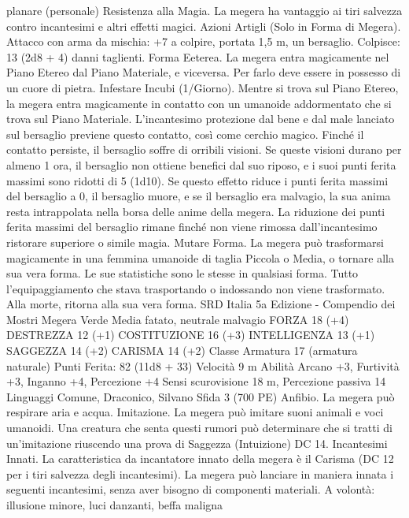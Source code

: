 \begin{multicols}{2}
planare (personale)
Resistenza alla Magia. La megera ha vantaggio ai tiri salvezza
contro incantesimi e altri effetti magici.
Azioni
Artigli (Solo in Forma di Megera). Attacco con arma da
mischia: +7 a colpire, portata 1,5 m, un bersaglio.
Colpisce: 13 (2d8 + 4) danni taglienti.
Forma Eeterea. La megera entra magicamente nel Piano Etereo
dal Piano Materiale, e viceversa. Per farlo deve essere in
possesso di un cuore di pietra.
Infestare Incubi (1/Giorno). Mentre si trova sul Piano Etereo, la
megera entra magicamente in contatto con un umanoide
addormentato che si trova sul Piano Materiale. L’incantesimo
protezione dal bene e dal male lanciato sul bersaglio previene questo
contatto, così come cerchio magico. Finché il contatto persiste, il
bersaglio soffre di orribili visioni. Se queste visioni durano per
almeno 1 ora, il bersaglio non ottiene benefici dal suo riposo, e i suoi
punti ferita massimi sono ridotti di 5 (1d10). Se questo effetto riduce
i punti ferita massimi del bersaglio a 0, il bersaglio muore, e se il
bersaglio era malvagio, la sua anima resta intrappolata nella borsa
delle anime della megera. La riduzione dei punti ferita massimi del
bersaglio rimane finché non viene rimossa dall’incantesimo ristorare
superiore o simile magia.
Mutare Forma. La megera può trasformarsi magicamente in una
femmina umanoide di taglia Piccola o Media, o tornare alla sua vera
forma. Le sue statistiche sono le stesse in qualsiasi forma. Tutto
l’equipaggiamento che stava trasportando o indossando non viene
trasformato. Alla morte, ritorna alla sua vera forma.
SRD Italia 5a Edizione - Compendio dei Mostri
Megera Verde
Media fatato, neutrale malvagio
FORZA 18 (+4)
DESTREZZA 12 (+1)
COSTITUZIONE 16 (+3)
INTELLIGENZA 13 (+1)
SAGGEZZA 14 (+2)
CARISMA 14 (+2)
Classe Armatura 17 (armatura naturale)
\hspace*{0pt}\hfill{Punti Ferita}: 82 (11d8 + 33)
Velocità 9 m
Abilità Arcano +3, Furtività +3, Inganno +4, Percezione +4
Sensi scurovisione 18 m, Percezione passiva 14
Linguaggi Comune, Draconico, Silvano
Sfida 3 (700 PE)
Anfibio. La megera può respirare aria e acqua.
Imitazione. La megera può imitare suoni animali e voci
umanoidi. Una creatura che senta questi rumori può determinare
che si tratti di un’imitazione riuscendo una prova di Saggezza
(Intuizione) DC 14.
Incantesimi Innati. La caratteristica da incantatore innato della
megera è il Carisma (DC 12 per i tiri salvezza degli incantesimi).
La megera può lanciare in maniera innata i seguenti incantesimi,
senza aver bisogno di componenti materiali.
A volontà: illusione minore, luci danzanti, beffa maligna

\end{multicols}

